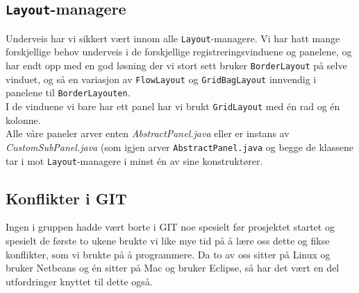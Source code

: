 \subsection{\texttt{Layout}-managere}
Underveis har vi sikkert vært innom alle \texttt{Layout}-managere. Vi har hatt mange forskjellige behov underveis i de forskjellige registreringsvinduene og panelene, og har endt opp med en god løsning der vi stort sett bruker \texttt{BorderLayout} på selve vinduet, og så en variasjon av \texttt{FlowLayout} og \texttt{GridBagLayout} innvendig i panelene til \texttt{BorderLayouten}. \\
I de vinduene vi bare har ett panel har vi brukt \texttt{GridLayout} med én rad og én kolonne. \\
Alle våre paneler arver enten \emph{AbstractPanel.java} eller er instans av \emph{CustomSubPanel.java} (som igjen arver \texttt{AbstractPanel.java} og begge de klassene tar i mot \texttt{Layout}-managere i minst én av sine konstruktører.

\subsection{Konflikter i GIT}
Ingen i gruppen hadde vært borte i GIT noe spesielt før prosjektet startet og spesielt de første to ukene brukte vi like mye tid på å lære oss dette og fikse konflikter, som vi brukte på å programmere. Da to av oss sitter på Linux og bruker Netbeans og én sitter på Mac og bruker Eclipse, så har det vært en del utfordringer knyttet til dette også.


